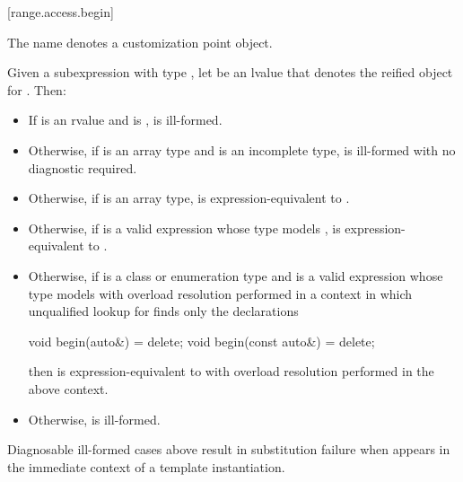 [range.access.begin]{}
%

\pnum
The name  denotes a customization point
object.

\pnum
Given a subexpression  with type ,
let  be an lvalue that denotes the reified object for .
Then:
\begin{itemize}
\item
  If  is an rvalue and
   is ,
   is ill-formed.

\item
  Otherwise, if  is an array type and
   is an incomplete type,
   is ill-formed with no diagnostic required.

\item
  Otherwise, if  is an array type,
   is expression-equivalent to .

\item
  Otherwise, if 
  is a valid expression whose type models
  ,
   is expression-equivalent to
  .

\item
  Otherwise, if  is a class or enumeration type and
  is a valid expression whose type models
  with overload resolution performed in a context in which
  unqualified lookup for  finds only the declarations
\begin{codeblock}
void begin(auto&) = delete;
void begin(const auto&) = delete;
\end{codeblock}
  then  is expression-equivalent to
  with overload resolution performed in the above context.

\item
  Otherwise,  is ill-formed.
\end{itemize}

\pnum
\begin{note}
Diagnosable ill-formed cases above
result in substitution failure when 
appears in the immediate context of a template instantiation.
\end{note}


